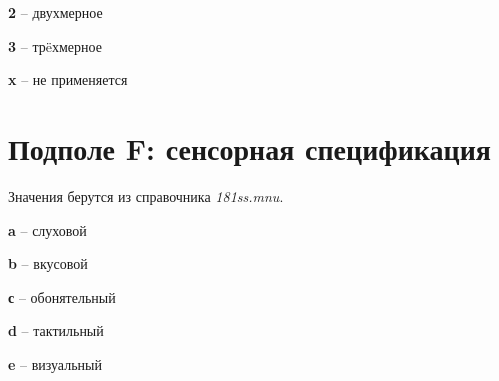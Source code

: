 \begin{cutelist}
    \item \textbf{2} -- двухмерное
    \item \textbf{3} -- тр\"eхмерное
    \item \textbf{x} -- не применяется
\end{cutelist}

\section{Подполе F: сенсорная спецификация}

Значения берутся из справочника \emph{181ss.mnu}.

\begin{cutelist}
    \item \textbf{a} -- слуховой
    \item \textbf{b} -- вкусовой
    \item \textbf{с} -- обонятельный
    \item \textbf{d} -- тактильный
    \item \textbf{e} -- визуальный
\end{cutelist}
